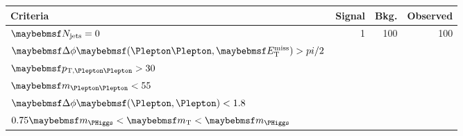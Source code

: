 
\begin{table}
	\begin{subtable}{\textwidth}
		\centering
		\begin{tabular}{lrrr}
			Criteria & Signal & Bkg. & Observed \\
			\hline
			$\njets = 0$              & 1 & 100 & 100 \\
			$\dphillmet > \pi/2$      & & & \\
			\unit{$\ptll > 30$}{\GeV} & & & \\
			\unit{$\mll < 55$}{\GeV}  & & & \\
			$\dphill < 1.8$           & & & \\
			$0.75\mH < \mt < \mH$     & & & \\
		\end{tabular}
	\end{subtable}
\end{table}

